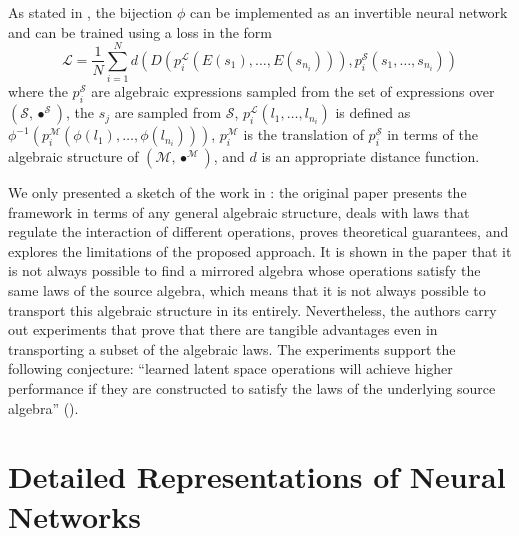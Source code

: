 \documentclass[11pt,a4paper,openright,twoside]{report}
\theoremstyle{plain}
\theoremstyle{definition}
\newcommand\dblquote[1]{\textquotedblleft #1\textquotedblright}
\begin{document}
As stated in \cite{pfrommer2024transport}, the bijection $\phi$ can be implemented as an invertible neural network and can be trained using a loss in the form
\[\mathcal{L} = \frac{1}{N}\sum_{i=1}^N d(D(p_i^{\mathcal{L}}(E(s_1),\dots,E(s_{n_i}))),p_i^{\mathcal{S}}(s_1, \dots, s_{n_i}))\]
where the $p_i^{\mathcal{S}}$ are algebraic expressions sampled from the set of expressions over $(\mathcal{S},\bullet^{\mathcal{S}})$, the $s_j$ are sampled from $\mathcal{S}$, $p_i^{\mathcal{L}}(l_1,\dots,l_{n_i})$ is defined as $\phi^{-1}(p_i^{\mathcal{M}}(\phi(l_1),\dots,\phi(l_{n_i})))$, $p_i^{\mathcal{M}}$ is the translation of $p_i^{\mathcal{S}}$ in terms of the algebraic structure of $(\mathcal{M},\bullet^{\mathcal{M}})$, and $d$ is an appropriate distance function.

We only presented a sketch of the work in \cite{pfrommer2024transport}: the original paper presents the framework in terms of any general algebraic structure, deals with laws that regulate the interaction of different operations, proves theoretical guarantees, and explores the limitations of the proposed approach. It is shown in the paper that it is not always possible to find a mirrored algebra whose operations satisfy the same laws of the source algebra, which means that it is not always possible to transport this algebraic structure in its entirely. Nevertheless, the authors carry out experiments that prove that there are tangible advantages even in transporting a subset of the algebraic laws. The experiments support the following conjecture: \dblquote{learned latent space operations will achieve higher performance if they are constructed to satisfy the laws of the underlying source algebra} (\cite{pfrommer2024transport}). 

\clearpage{\pagestyle{empty}\cleardoublepage}


\chapter{Detailed Representations of Neural Networks}
\lhead[\fancyplain{}{\bfseries\thepage}]{\fancyplain{}{\bfseries\rightmark}}
\end{document}
